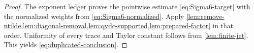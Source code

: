 \begin{proof}
The exponent ledger proves the pointwise estimate
\cref{eq:Sigma6-target} with the normalized weights from
\cref{eq:Sigma6-normalized}.  Apply
\cref{lem:remove-ntilde,lem:diagonal-removal,lem:qvdc-supported,lem:prepared-factor}
in that order.  Uniformity of every trace and Taylor constant follows from
\cref{lem:finite-jet}.  This yields \cref{eq:duplicated-conclusion}.
\end{proof}
